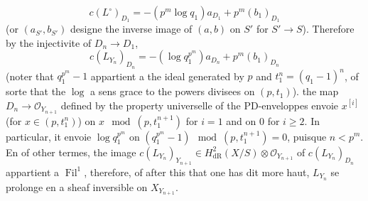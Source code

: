 \documentclass[12pt,a4paper]{article}
\theoremstyle{plain}
\theoremstyle{definition}
\theoremstyle{remark}
\DeclareMathOperator{\Fil}{Fil}
\begin{document}
\[
c(L^\circ)_{D_1} = -(p^m \log q_1)a_{D_1} + p^m (b_1)_{D_1}
\]
(or $(a_{S'}, b_{S'})$ designe the inverse image of $(a, b)$ on $S'$ for $S' \to S$). Therefore by the injectivite of $D_n \to D_1$,
\[
c(L_{Y_n})_{D_n} = -(\log q_1^{p^m})a_{D_n} + p^m (b_1)_{D_n}
\]
(noter that $q_1^{p^m} - 1$ appartient a the ideal generated by $p$ and $t_1^n = (q_1 - 1)^n$, of sorte that the $\log$ a sens grace to the powers divisees on $(p, t_1)$). the map $D_n \to \mathcal{O}_{Y_{n+1}}$ defined by the property universelle of the PD-enveloppes envoie $x^{[i]}$ (for $x \in (p, t_1^n)$) on $x \mod (p, t_1^{n+1})$ for $i = 1$ and on $0$ for $i \geqslant 2$. In particular, it envoie $\log q_1^{p^m}$ on $(q_1^{p^m} - 1) \mod (p, t_1^{n+1}) = 0$, puisque $n < p^m$. En of other termes, the image $c(L_{Y_n})_{Y_{n+1}} \in H^2_\mathrm{dR}(X/S) \otimes \mathcal{O}_{Y_{n+1}}$ of $c(L_{Y_n})_{D_n}$ appartient a $\Fil^1$, therefore, of after this that one has dit more haut, $L_{Y_n}$ se prolonge en a sheaf inversible on $X_{Y_{n+1}}$.
\end{document}
